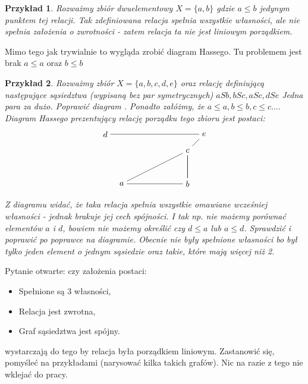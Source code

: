 \documentclass[12pt,a4paper]{report}
\newtheorem{example}{Przykład}
\begin{document}
\begin{example}
Rozważmy zbiór dwuelementowy $X = \{ a, b \}$ gdzie $a \leq b$ jedynym punktem tej relacji. Tak zdefiniowana relacja spełnia wszystkie własności, ale nie spełnia założenia o zwrotności - zatem relacja ta nie jest liniowym porządkiem.
\end{example}

{\color{red} Mimo tego jak trywialnie to wygląda zrobić diagram Hassego. Tu problemem jest brak $a \leq a$ oraz $b \leq b$}

\begin{example}
Rozważmy zbiór $X = \{a,b,c,d,e \}$ oraz relację definiującą następujące sąsiedztwa (wypisaną bez par symetrycznych)
$aSb, bSc, aSc, dSe$ {\color{red} Jedna para za dużo. Poprawić diagram .} Ponadto załóżmy, że $a \leq a, b \leq b, c\leq c \ldots$.
Diagram Hassego prezentujący relację porządku tego zbioru jest postaci:
$$
\begin{tikzpicture}[scale=.7]
  \node (a) at (-2,0) {$a$};
  \node (b) at (2,0) {$b$};
  \node (c) at (2,2) {$c$};
 \node (e) at (3,3) {$e$};
 \node (d) at (-3,3) {$d$};
  \draw (b)--(a) --(c)-- (b) -- (c)--(e)--(d); %
\end{tikzpicture}
$$
{\color{blue}Z diagramu widać, że taka relacja spełnia wszystkie omawiane wcześniej własności - jednak brakuje jej cech spójności. I tak np. nie możemy porównać elementów $a$ i $d$, bowiem nie możemy określić czy  $d \leq a$ lub $a \leq d$.\color{red} Sprawdzić i poprawić po poprawce na diagramie. Obecnie nie były spełnione własności bo był tylko jeden element o jednym sąsiedzie oraz takie, które mają więcej niż 2.}
\end{example}

{\color{red}Pytanie otwarte: czy założenia postaci:
\begin{itemize}
\item Spełnione są 3 własności,
\item Relacja jest zwrotna,
\item Graf sąsiedztwa jest spójny.
\end{itemize}
wystarczają do tego by relacja była porządkiem liniowym. Zastanowić się, pomyśleć na przykładami (narysować kilka takich grafów). Nic na razie z tego nie wklejać do pracy. 
}
\end{document}
